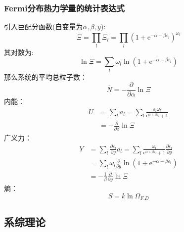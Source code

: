 \documentclass[12pt]{article}
\begin{document}
\subsubsection{Fermi分布热力学量的统计表达式}
\noindent
引入巨配分函数(自变量为$\alpha, \beta, y$):
\begin{equation}
	\Xi = \prod_l \Xi_l =\prod_l (1+\mathrm{e}^{-\alpha-\beta \varepsilon_l})^{\omega_l}
\end{equation}
其对数为:
\begin{equation}
	\ln \Xi=\sum_l \omega_l \ln (1+\mathrm{e}^{-\alpha-\beta \varepsilon_l}) 
\end{equation}
那么系统的平均总粒子数：
\begin{equation}
	\bar{N}=-\frac{\partial}{\partial \alpha}\ln \Xi
\end{equation}
内能：
\begin{equation}
	\begin{split}
		U&=\sum_l a_l=\sum_l \frac{\varepsilon_l \omega_l}{\mathrm{e}^{\alpha+\beta \varepsilon_l}+1}\\
		&=-\frac{\partial }{\partial \beta}\ln \Xi
	\end{split}
\end{equation}
广义力：
\begin{equation}
	\begin{split}
		Y&=\sum_l \frac{\partial \varepsilon_l}{\partial y} a_l=\sum_l \frac{\omega_l}{\mathrm{e}^{\alpha+\beta \varepsilon_l}+1}\frac{\partial \varepsilon_l}{\partial y}\\
		&=\sum_l\omega_l \frac{\partial}{\partial y}\ln (1+\mathrm{e}^{-\alpha-\beta \varepsilon_l}) \\
		&=-\frac{1}{\beta}\frac{\partial}{\partial y}\ln \Xi
	\end{split}
\end{equation}
熵：
\begin{equation}
	S=k\ln \Omega_{F.D}
\end{equation}

\newpage
\subsection{系综理论}
\end{document}
